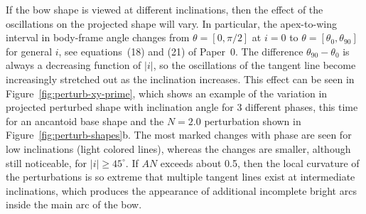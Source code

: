If the bow shape is viewed at different inclinations, then the effect
of the oscillations on the projected shape will vary.  In particular,
the apex-to-wing interval in body-frame angle changes from
\(\theta = [0, \pi/2]\) at \(i = 0\) to
\(\theta = [\theta_0, \theta_{90}]\) for general \(i\), see equations~(18) and (21)
of Paper~0.  The difference \(\theta_{90} - \theta_0\) is always a decreasing
function of \(|i|\), so the oscillations of the tangent line become
increasingly stretched out as the inclination increases.  This effect
can be seen in Figure~\ref{fig:perturb-xy-prime}, which shows an
example of the variation in projected perturbed shape with inclination
angle for 3 different phases, this time for an ancantoid base shape
and the \(N = 2.0\) perturbation shown in
Figure~\ref{fig:perturb-shapes}b.  The most marked changes with phase
are seen for low inclinations (light colored lines), whereas the
changes are smaller, although still noticeable, for
\(|i| \ge 45^\circ\). If \(A N\) exceeds about 0.5, then the local curvature
of the perturbations is so extreme that multiple tangent lines exist
at intermediate inclinations, which produces the appearance of
additional incomplete bright arcs inside the main arc of the bow.


